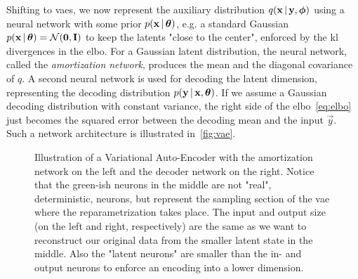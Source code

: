 	Shifting to \acp{vae}, we now represent the auxiliary distribution \( q(\boldsymbol{\mathrm{x}} \,\vert\, \boldsymbol{\mathrm{y}}, \boldsymbol{\mathrm{\phi}}) \) using a neural network with some prior \( p(\boldsymbol{\mathrm{x}} \,\vert\, \boldsymbol{\mathrm{\theta}}) \), e.g. a standard Gaussian \( p(\boldsymbol{\mathrm{x}} \,\vert\, \boldsymbol{\mathrm{\theta}}) = \mathcal{N}(\boldsymbol{\mathrm{0}}, \boldsymbol{\mathrm{I}}) \) to keep the latents "close to the center", enforced by the \ac{kl} divergences in the \ac{elbo}. For a Gaussian latent distribution, the neural network, called the \emph{amortization network}, produces the mean and the diagonal covariance of \( q \). A second neural network is used for decoding the latent dimension, representing the decoding distribution \( p(\boldsymbol{\mathrm{y}} \,\vert\, \boldsymbol{\mathrm{x}}, \boldsymbol{\mathrm{\theta}}) \). If we assume a Gaussian decoding distribution with constant variance, the right side of the \ac{elbo}~\eqref{eq:elbo} just becomes the squared error between the decoding mean and the input \(\vec{y}\). Such a network architecture is illustrated in~\autoref{fig:vae}.

	\begin{figure}
		\centering
		\tikzVariationalAutoEncoder
		\caption{Illustration of a Variational Auto-Encoder with the amortization network on the left and the decoder network on the right. Notice that the green-ish neurons in the middle are not "real", deterministic, neurons, but represent the sampling section of the \ac{vae} where the reparametrization takes place. The input and output size (on the left and right, respectively) are the same as we want to reconstruct our original data from the smaller latent state in the middle. Also the "latent neurons" are smaller than the in- and output neurons to enforce an encoding into a lower dimension.}
		\label{fig:vae}
	\end{figure}

